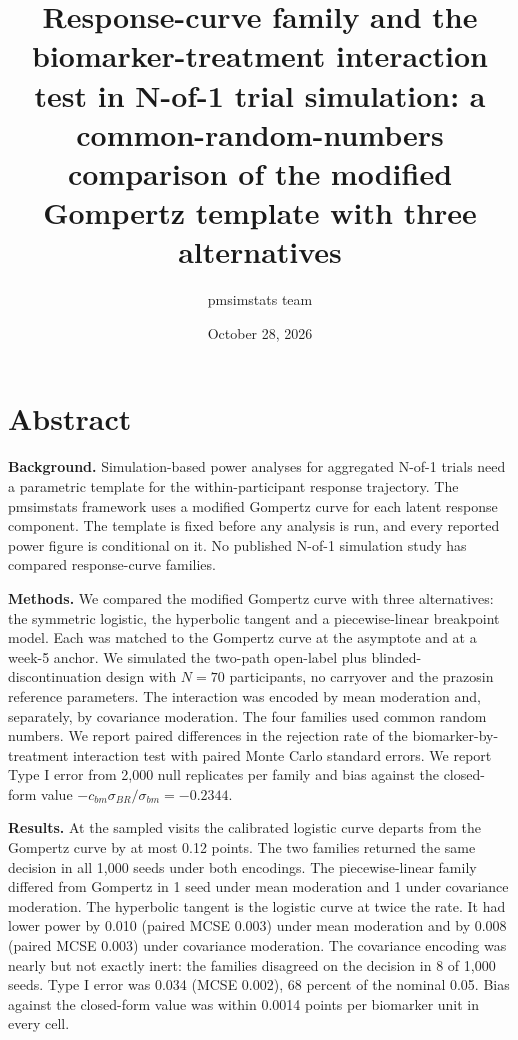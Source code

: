 \documentclass[
  11pt,
]{article}
\title{Response-curve family and the biomarker-treatment interaction test in N-of-1 trial simulation: a common-random-numbers comparison of the modified Gompertz template with three alternatives}
\author{pmsimstats team}
\date{October 28, 2026}
\begin{document}
\maketitle

{
\setcounter{tocdepth}{2}
\tableofcontents
}
\section*{Abstract}\label{abstract}

\textbf{Background.} Simulation-based power analyses for aggregated N-of-1
trials need a parametric template for the within-participant
response trajectory. The pmsimstats framework uses a modified Gompertz
curve for each latent response component. The template is fixed before
any analysis is run, and every reported power figure is conditional on
it. No published N-of-1 simulation study has compared response-curve
families.

\textbf{Methods.} We compared the modified Gompertz curve with three
alternatives: the symmetric logistic, the hyperbolic tangent and a
piecewise-linear breakpoint model. Each was matched to the Gompertz
curve at the asymptote and at a week-5 anchor. We simulated the
two-path open-label plus blinded-discontinuation design with
\(N = 70\) participants, no carryover and the prazosin reference
parameters. The interaction was encoded by mean moderation and,
separately, by covariance moderation. The four families used common
random numbers. We report paired differences in the rejection rate of
the biomarker-by-treatment interaction test with paired Monte Carlo
standard errors. We report Type I error from 2,000
null replicates per family and bias against the closed-form value
\(-c_{bm}\sigma_{BR}/\sigma_{bm} = -0.2344\).

\textbf{Results.} At the sampled visits the calibrated logistic curve departs from the Gompertz curve by at most 0.12 points. The two families returned the same decision in all 1,000 seeds under both encodings. The piecewise-linear family differed from Gompertz in 1 seed under mean moderation and 1 under covariance moderation. The hyperbolic tangent is the logistic curve at twice the rate. It had lower power by 0.010 (paired MCSE 0.003) under mean moderation and by 0.008 (paired MCSE 0.003) under covariance moderation. The covariance encoding was nearly but not exactly inert: the families disagreed on the decision in 8 of 1,000 seeds. Type I error was 0.034 (MCSE 0.002), 68 percent of the nominal 0.05. Bias against the closed-form value was within 0.0014 points per biomarker unit in every cell.
\end{document}
